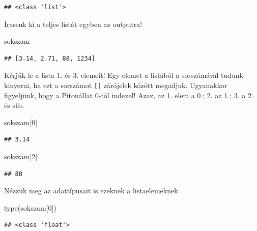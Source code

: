 \documentclass[
]{book}
\newenvironment{Shaded}{\begin{snugshade}}{\end{snugshade}}
\newcommand{\BuiltInTok}[1]{#1}
\newcommand{\DecValTok}[1]{\textcolor[rgb]{0.00,0.00,0.81}{#1}}
\newcommand{\NormalTok}[1]{#1}
\begin{document}
\begin{verbatim}
## <class 'list'>
\end{verbatim}

Írassuk ki a teljes listát egyben az outputra!

\begin{Shaded}
\begin{Highlighting}[]
\NormalTok{sokszam}
\end{Highlighting}
\end{Shaded}

\begin{verbatim}
## [3.14, 2.71, 88, 1234]
\end{verbatim}

Kérjük le a lista \(1.\) és \(3.\) elemeit! Egy elemet a listából a sorszámával tudunk kinyerni, ha ezt a sorszámot \texttt{{[}{]}} zárójelek között megadjuk. Ugyanakkor figyeljünk, hogy a Pitonállat \(0\)-tól indexel! Azaz, az 1. elem a 0.; 2. az 1.; 3. a 2. és stb.

\begin{Shaded}
\begin{Highlighting}[]
\NormalTok{sokszam[}\DecValTok{0}\NormalTok{]}
\end{Highlighting}
\end{Shaded}

\begin{verbatim}
## 3.14
\end{verbatim}

\begin{Shaded}
\begin{Highlighting}[]
\NormalTok{sokszam[}\DecValTok{2}\NormalTok{]}
\end{Highlighting}
\end{Shaded}

\begin{verbatim}
## 88
\end{verbatim}

Nézzük meg az adattípusait is ezeknek a listaelemeknek.

\begin{Shaded}
\begin{Highlighting}[]
\BuiltInTok{type}\NormalTok{(sokszam[}\DecValTok{0}\NormalTok{])}
\end{Highlighting}
\end{Shaded}

\begin{verbatim}
## <class 'float'>
\end{verbatim}
\end{document}
